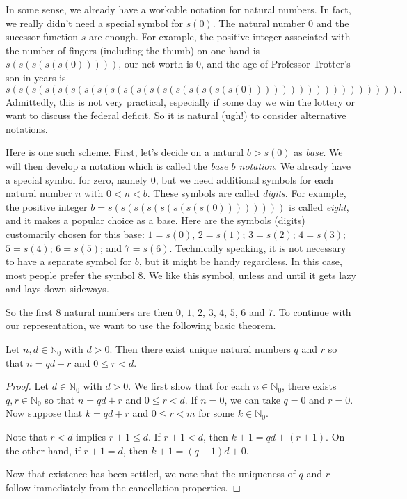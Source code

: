 In some sense, we already have a workable notation for natural numbers.
In fact, we really didn't need a special symbol for $s(0)$.
The natural number $0$ and the sucessor function $s$ are enough.
For example, the positive integer associated
with the number of fingers (including the thumb) 
on one hand is
$s(s(s(s(s(0)))))$, our net worth is $0$, and the age of Professor
Trotter's son in years is
\[
s(s(s(s(s(s(s(s(s(s(s(s(s(s(s(s(s(s(0)))))))))))))))))).
\]
Admittedly, this is not very practical, especially if some day
we win the lottery or want to discuss the federal deficit. 
So it is natural (ugh!) to consider alternative notations.  

Here is one such scheme.  First, let's
decide on a natural $b>s(0)$ as \textit{base}.  We will
then develop a notation which is called the \textit{base $b$
notation}.  We already have a special symbol for zero, namely $0$,
but we need additional symbols for each natural number $n$ with
$0<n<b$. These symbols
are called \textit{digits}.  For example,
the positive integer $b=s(s(s(s(s(s(s(s(0))))))))$ is called 
\textit{eight}, and it makes a popular choice as a base.
Here are the symbols (digits) customarily chosen for this base: 
$1=s(0)$, $2=s(1)$;
$3=s(2)$; $4=s(3)$; $5=s(4)$; $6=s(5)$; and $7=s(6)$.  Technically
speaking, it is not necessary to have a separate symbol for
$b$, but it might be handy regardless. In this case, most
people prefer the symbol $8$.  We like this symbol, unless and until
it gets lazy and lays down sideways.

So the first $8$ natural numbers are then $0$, $1$, $2$, $3$, $4$,
$5$, $6$ and $7$.  To continue with our representation, we want 
to use the following basic theorem.

\begin{theorem}
Let $n,d\in \mathbb{N}_0$ with $d>0$.  Then there exist unique natural
numbers $q$ and $r$ so that $n=qd+r$ and $0\le r < d$.
\end{theorem}

\begin{proof}
Let $d\in \mathbb{N}_0$ with $d>0$.  We first show that for each 
$n\in\mathbb{N}_0$, there exists $q,r\in\mathbb{N}_0$ so that
$n=qd+r$ and $0\le r<d$.  If $n=0$, we can take
$q=0$ and $r=0$.  Now suppose that $k=qd+r$ and $0\le r<m$ for 
some $k\in \mathbb{N}_0$.

Note that $r<d$ implies $r+1\le d$.
If $r+1<d$, then $k+1=qd+(r+1)$. On the other hand, if
$r+1=d$, then $k+1=(q+1)d+0$.

Now that existence has been settled, we note that the uniqueness 
of $q$ and $r$ follow immediately from the cancellation properties.
\end{proof}

